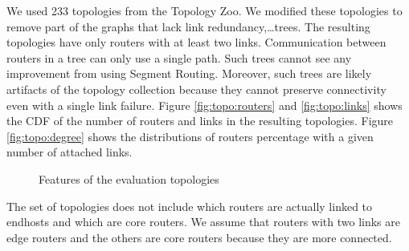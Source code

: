 
We used 233 topologies from the Topology Zoo.
We modified these topologies to remove part of the graphs that lack link redundancy,\dots trees.
The resulting topologies have only routers with at least two links.
Communication between routers in a tree can only use a single path.
Such trees cannot see any improvement from using Segment Routing.
Moreover, such trees are likely artifacts of the topology collection
because they cannot preserve connectivity even with a single link failure.
Figure \ref{fig:topo:routers} and \ref{fig:topo:links} shows the CDF
of the number of routers and links in the resulting topologies.
Figure \ref{fig:topo:degree} shows the distributions of routers percentage with a given number
of attached links.

\begin{figure}
	\centering
	\caption{Features of the evaluation topologies}
	\label{fig:topo}
\end{figure}

The set of topologies does not include which routers are actually linked to endhosts
and which are core routers. We assume that routers with two links are edge routers
and the others are core routers because they are more connected.

